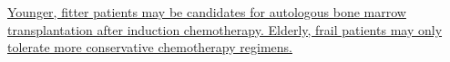 \documentclass[10pt, a4paper]{article}
\begin{document}
\begin{multicols}{2}
\begin{enumerate}
 \vspace{6pt} 

\parbox{\linewidth}{\item \href{https://www.notion.so/Lymphoma-and-Myeloma-1eff452307b84bbb8c322dccc30bf017}{ Younger, fitter patients may be candidates for autologous bone marrow transplantation after induction chemotherapy. Elderly, frail patients may only tolerate more conservative chemotherapy regimens.}} 

 \vspace{6pt} 

\end{enumerate}\end{multicols} 
 
\end{document}
